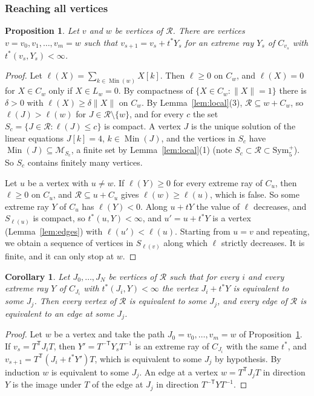 \documentclass[11pt,reqno]{amsart}
\renewcommand{\_}{\origunderscore\allowbreak}
\numberwithin{equation}{section}
\theoremstyle{plain}
\newtheorem{prop}[thm]{Proposition}
\newtheorem{cor}[thm]{Corollary}
\theoremstyle{definition}
\theoremstyle{remark}
\newcommand{\M}{\mathcal{M}}
\newcommand{\Rk}{\mathcal{R}}
\newcommand{\Sym}{\mathrm{Sym}}
\newcommand{\Min}{\operatorname{Min}}
\begin{document}
\subsubsection{Reaching all vertices}

\begin{prop}\label{prop:connected}
Let $v$ and $w$ be vertices of $\Rk$. There are vertices $v=v_0,v_1,\dots,v_m=w$ such that $v_{s+1}=v_s+t^*Y_s$ for an extreme ray $Y_s$ of $C_{v_s}$ with $t^*(v_s,Y_s)<\infty$.
\end{prop}

\begin{proof}
Let $\ell(X)=\sum_{k\in\Min(w)}X[k]$. Then $\ell\ge0$ on $C_w$, and $\ell(X)=0$ for $X\in C_w$ only if $X\in L_w=0$. By compactness of $\{X\in C_w:\|X\|=1\}$ there is $\delta>0$ with $\ell(X)\ge\delta\|X\|$ on $C_w$. By Lemma~\ref{lem:local}(3), $\Rk\subseteq w+C_w$, so $\ell(J)>\ell(w)$ for $J\in\Rk\setminus\{w\}$, and for every $c$ the set $S_c=\{J\in\Rk:\ell(J)\le c\}$ is compact. A vertex $J$ is the unique solution of the linear equations $J[k]=4$, $k\in\Min(J)$, and the vertices in $S_c$ have $\Min(J)\subseteq\M_{S_c}$, a finite set by Lemma~\ref{lem:local}(1) (note $S_c\subset\Rk\subset\Sym_5^+$). So $S_c$ contains finitely many vertices.

Let $u$ be a vertex with $u\ne w$. If $\ell(Y)\ge0$ for every extreme ray of $C_u$, then $\ell\ge0$ on $C_u$, and $\Rk\subseteq u+C_u$ gives $\ell(w)\ge\ell(u)$, which is false. So some extreme ray $Y$ of $C_u$ has $\ell(Y)<0$. Along $u+tY$ the value of $\ell$ decreases, and $S_{\ell(u)}$ is compact, so $t^*(u,Y)<\infty$, and $u'=u+t^*Y$ is a vertex (Lemma~\ref{lem:edges}) with $\ell(u')<\ell(u)$. Starting from $u=v$ and repeating, we obtain a sequence of vertices in $S_{\ell(v)}$ along which $\ell$ strictly decreases. It is finite, and it can only stop at $w$.
\end{proof}

\begin{cor}\label{cor:closure}
Let $J_0,\dots,J_N$ be vertices of $\Rk$ such that for every $i$ and every extreme ray $Y$ of $C_{J_i}$ with $t^*(J_i,Y)<\infty$ the vertex $J_i+t^*Y$ is equivalent to some $J_j$. Then every vertex of $\Rk$ is equivalent to some $J_j$, and every edge of $\Rk$ is equivalent to an edge at some $J_j$.
\end{cor}

\begin{proof}
Let $w$ be a vertex and take the path $J_0=v_0,\dots,v_m=w$ of Proposition~\ref{prop:connected}. If $v_s=T^{\mathsf T}J_iT$, then $Y'=T^{-\mathsf T}Y_sT^{-1}$ is an extreme ray of $C_{J_i}$ with the same $t^*$, and $v_{s+1}=T^{\mathsf T}(J_i+t^*Y')T$, which is equivalent to some $J_j$ by hypothesis. By induction $w$ is equivalent to some $J_j$. An edge at a vertex $w=T^{\mathsf T}J_jT$ in direction $Y$ is the image under $T$ of the edge at $J_j$ in direction $T^{-\mathsf T}YT^{-1}$.
\end{proof}
\end{document}
